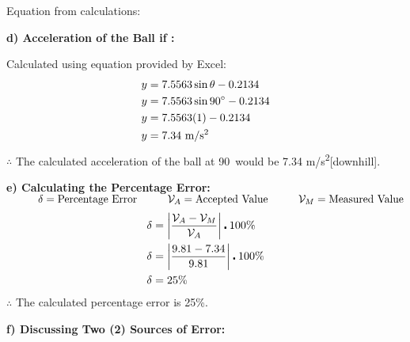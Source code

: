 \documentclass[12pt,letterpaper]{article}
\newcommand\tab[1][1cm]{\hspace*{#1}}
\begin{document}
\noindent
\tab Equation from calculations: \\
\vspace{-4mm}

\noindent
\textbf{\tab d) Acceleration of the Ball if \textdegree:}

\noindent
\tab Calculated using equation provided by Excel:
\vspace{-4mm}
\[
	\begin{aligned}
		y & =7.5563\sin \theta - 0.2134         \\
		y & =7.5563\sin 90\degree - 0.2134      \\
		y & =7.5563(1) - 0.2134                 \\
		y & =7.34~\text{m/s\textsuperscript{2}}
	\end{aligned}
	\vspace{-4mm}
\]
\noindent
\tab$\therefore$ The calculated acceleration of the ball at 90\textdegree\ would be 7.34 m/s\textsuperscript{2}[downhill].

\vspace{4mm}
\noindent
\textbf{\tab e) Calculating the Percentage Error:}\\
\noindent
\tab $ \tab \delta = \text{Percentage Error} \tab \mathcal{V}_{A} = \text{Accepted Value} \tab \mathcal{V}_{M} = \text{Measured Value}$
\[
	\begin{aligned}
		\delta & = \left\lvert \frac{ \mathcal{V}_{A} - \mathcal{V}_{M} }{\mathcal{V}_{A}} \right\rvert \centerdot 100\% \\
		\delta & = \left\lvert \frac{9.81-7.34}{9.81}\right\rvert \centerdot 100\%                                       \\
		\delta & = 25\%
	\end{aligned}
	\vspace{-4mm}
\]
\noindent
\tab $\therefore$ The calculated percentage error is 25\%.

\newpage

\noindent
\textbf{\tab f) Discussing Two (2) Sources of Error:}
\end{document}
